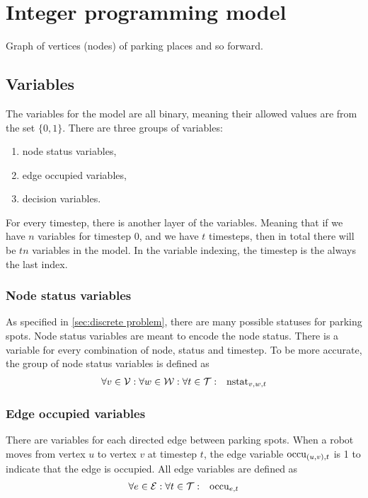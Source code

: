 \section{Integer programming model}
Graph of vertices (nodes) of parking places and so forward.
\subsection{Variables}
The variables for the model are all binary, meaning their allowed values are from the set
$\{0,1\}$. There are three groups of variables:
\begin{enumerate}
    \item node status variables,
    \item edge occupied variables,
    \item decision variables.
\end{enumerate}
For every timestep, there is another layer of the variables. Meaning that if
we have $n$ variables for timestep $0$, and we have $t$ timesteps, then in total
there will be $tn$ variables in the model. In the variable indexing, the
timestep is the always the last index.

\subsubsection{Node status variables}
As specified in \autoref{sec:discrete problem}, there are many possible statuses
for parking spots. Node status variables are meant to encode the node status.
There is a variable for every combination of node, status and timestep. To be
more accurate, the group of node status variables is defined as
\begin{align}
    &\forall v \in \mathcal{V}: \forall w \in \mathcal{W}: \forall t \in \mathcal{T}: & \mathrm{nstat}_{v,w,t}
\end{align}

\subsubsection{Edge occupied variables}
There are variables for each directed edge between parking spots. When a robot
moves from vertex $u$ to vertex $v$ at timestep $t$, the edge variable
$\mathrm{occu}_{(u,v),t}$ is 1 to indicate that the edge is occupied. All edge variables
are defined as
\begin{align}
    &\forall e \in \mathcal{E}: \forall t \in \mathcal{T}: & \mathrm{occu}_{e,t}
\end{align}

